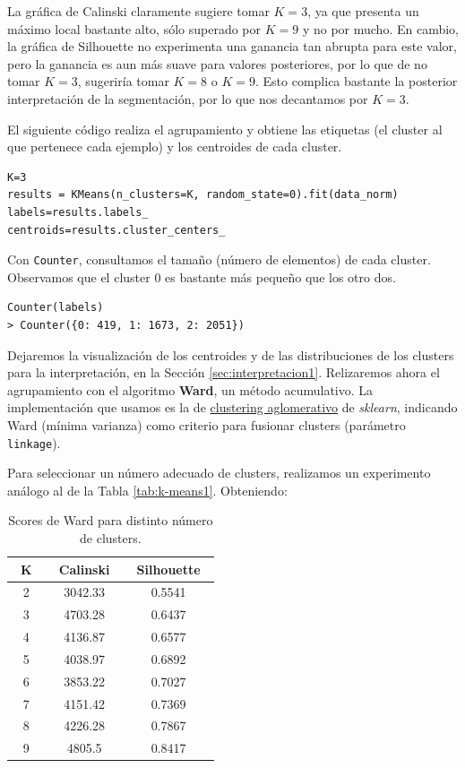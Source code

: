 \documentclass[oneside]{book}
\begin{document}
La gráfica de Calinski claramente sugiere tomar $K=3$, ya que presenta
un máximo local bastante alto, sólo superado por $K=9$ y no por
mucho. En cambio, la gráfica de Silhouette no experimenta una ganancia
tan abrupta para este valor, pero la ganancia es aun más suave para
valores posteriores, por lo que de no tomar $K=3$, sugeriría tomar
$K=8$ o $K=9$. Esto complica bastante la posterior interpretación de
la segmentación, por lo que nos decantamos por $K=3$.

El siguiente código realiza el agrupamiento y obtiene las etiquetas
(el cluster al que pertenece cada ejemplo) y los centroides de cada
cluster.

\begin{verbatim}
K=3
results = KMeans(n_clusters=K, random_state=0).fit(data_norm)
labels=results.labels_
centroids=results.cluster_centers_
\end{verbatim}

Con \texttt{Counter}, consultamos el tamaño (número de elementos) de
cada cluster. Observamos que el cluster 0 es bastante más pequeño que
los otro dos.
\begin{verbatim}
Counter(labels)
> Counter({0: 419, 1: 1673, 2: 2051})
\end{verbatim}

Dejaremos la visualización de los centroides y de las distribuciones
de los clusters para la interpretación, en la Sección
\ref{sec:interpretacion1}. Relizaremos ahora el agrupamiento con el
algoritmo \textbf{Ward}, un método acumulativo. La implementación que
usamos es la de
\href{https://scikit-learn.org/stable/modules/generated/sklearn.cluster.AgglomerativeClustering.html}{clustering
  aglomerativo} de \textit{sklearn}, indicando Ward (mínima varianza)
como criterio para fusionar clusters (parámetro \texttt{linkage}).

Para seleccionar un número adecuado de clusters, realizamos un
experimento análogo al de la Tabla \ref{tab:k-means1}. Obteniendo:

\begin{table}[H]
  \centering
\begin{tabular}{|c|cc|}
  \hline
  ~\hspace{2mm}K\hspace{2mm}~ & ~\hspace{2mm}Calinski\hspace{2mm}~ & ~\hspace{2mm}Silhouette\hspace{2mm}~ \\ \hline
2 & 3042.33 & 0.5541 \\ \hline
3 & 4703.28 & 0.6437 \\ \hline
4 & 4136.87 & 0.6577 \\ \hline
5 & 4038.97 & 0.6892 \\ \hline
6 & 3853.22 & 0.7027 \\ \hline
7 & 4151.42 & 0.7369 \\ \hline
8 & 4226.28 & 0.7867 \\ \hline
9 & 4805.5 & 0.8417 \\ \hline
\end{tabular}
\caption{Scores de Ward para distinto número de clusters.}
\label{tab:ward1}
\end{table}
\end{document}
